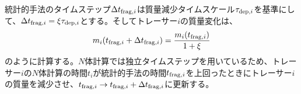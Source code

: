 \documentclass[a4paper,10pt,oneside,twocolumn,notitlepage,final]{jarticle}
\begin{document}
統計的手法のタイムステップ$\Delta t_{{\rm frag},i}$は質量減少タイムスケール$\tau_{{\rm dep},i}$を基準にして、$\Delta t_{{\rm frag},i} = \xi \tau_{{\rm dep},i}$とする。そしてトレーサー$i$の質量変化は、
\begin{align}
 m_i(t_{{\rm frag},i} + \Delta t_{{\rm frag},i}) = \frac{m_i(t_{{\rm frag},i})}{1 + \xi}
\end{align}
のように計算する。$N$体計算では独立タイムステップを用いているため、トレーサー$i$の$N$体計算の時間$t_i$が統計的手法の時間$t_{{\rm frag},i}$を上回ったときにトレーサー$i$の質量を減少させ、$t_{{\rm frag},i} \to t_{{\rm frag},i} + \Delta t_{{\rm frag},i}$に更新する。



\end{document}
